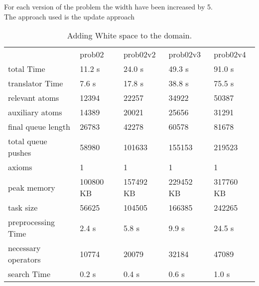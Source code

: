 			
			\begin{table}[h]
				\centering
				\caption{Adding White space to the domain.}
				 For each version of the problem the width have been increased by 5.\\ The approach used is the update approach
				\label{whitespace}
				\begin{tabular}{lllll}
					& prob02 & prob02v2 & prob02v3 & prob02v4\\
					total Time & 11.2 s& 24.0 s& 49.3 s& 91.0 s\\
					translator Time& 7.6 s& 17.8 s& 38.8 s & 75.5 s\\
					
					relevant atoms & 12394 & 22257 & 34922  & 50387\\
					auxiliary atoms &14389 & 20021 & 25656  & 31291\\
					final queue length &26783 & 42278 &60578  & 81678\\
					total queue pushes & 58980 & 101633 & 155153 & 219523\\
					axioms & 1 & 1  & 1 & 1 \\ 
					peak memory & 100800 KB & 157492 KB & 229452 KB& 317760 KB\\ 
					task size & 56625 &  104505 & 166385 & 242265\\
					
					
					preprocessing Time& 2.4 s& 5.8 s& 9.9 s & 24.5 s \\
					necessary operators & 10774 & 20079  & 32184 & 47089\\
					search Time & 0.2 s& 0.4 s& 0.6 s& 1.0 s\\
				\end{tabular}
			\end{table}
			
